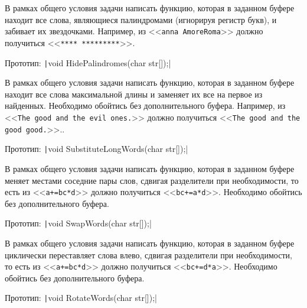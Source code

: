 
\begin{zztask}
В рамках общего условия задачи написать функцию, которая в заданном буфере
находит все слова, являющиеся палиндромами (игнорируя регистр букв), и
забивает их звездочками.
Например, из
<<\texttt{anna AmoreRoma}>>
должно получиться
<<\texttt{**** *********}>>.

Прототип: \texttt|void HidePalindromes(char str[]);|
\end{zztask}


\begin{zztask}
В рамках общего условия задачи написать функцию, которая в заданном буфере
находит все слова максимальной длины и заменяет их все на первое из
найденных.
Необходимо обойтись без дополнительного буфера.
Например, из
<<\texttt{The good and the evil ones.}>>
должно получиться
<<\texttt{The good and the good good.}>>..

Прототип: \texttt|void SubstituteLongWords(char str[]);|
\end{zztask}


\begin{zztask}
В рамках общего условия задачи написать функцию, которая в заданном буфере
меняет местами соседние пары слов, сдвигая разделители при необходимости, то
есть из <<\texttt{a+=bc*d}>> должно получиться <<\texttt{bc+=a*d}>>.
Необходимо обойтись без дополнительного буфера.

Прототип: \texttt|void SwapWords(char str[]);|
\end{zztask}


\begin{zztask}
В рамках общего условия задачи написать функцию, которая в заданном буфере
циклически переставляет слова влево, сдвигая разделители при необходимости,
то есть из <<\texttt{a+=bc*d}>> должно получиться <<\texttt{bc+=d*a}>>.
Необходимо обойтись без дополнительного буфера.

Прототип: \texttt|void RotateWords(char str[]);|
\end{zztask}

